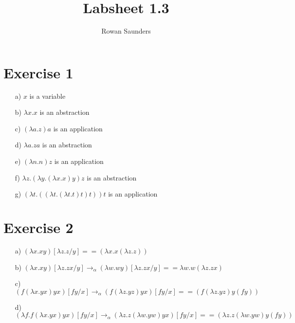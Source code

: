 \documentclass[11pt]{article}
\title{Labsheet 1.3}
\author{Rowan Saunders}
\begin{document}
\maketitle

\section{Exercise 1}
\begin{itemize}
  \item[a)] $x$ is a variable
  \item[b)] $\lambda x.x$ is an abstraction
  \item[c)] $(\lambda a.z)a$ is an application
  \item[d)] $\lambda a.za$ is an abstraction
  \item[e)] $(\lambda n.n)z$ is an application
  \item[f)] $\lambda z.(\lambda y.(\lambda x.x)y)z$ is an abstraction
  \item[g)] $(\lambda t.((\lambda t.(\lambda t.t)t)t))t$ is an application
\end{itemize}

\section{Exercise 2}
\begin{itemize}
  \item[a)] $(\lambda x.xy)[\lambda z.z / y] == (\lambda x.x(\lambda z.z))$
  \item[b)] $(\lambda x.xy)[\lambda z.zx / y] \to_\alpha (\lambda w.wy)[\lambda
    z.zx / y] == \lambda w.w(\lambda z.zx)$
  \item[c)] $(f(\lambda x.yx)yx)[fy / x] \to_\alpha (f (\lambda z.yz)yx)[fy / x]
    == (f(\lambda z.yz)y(fy))$
  \item[d)] $(\lambda f.f(\lambda x.yx)yx)[fy / x] \to_\alpha (\lambda
    z.z(\lambda w.yw)yx)[fy / x] == (\lambda z.z(\lambda w.yw)y(fy))$
\end{itemize}
\end{document}
